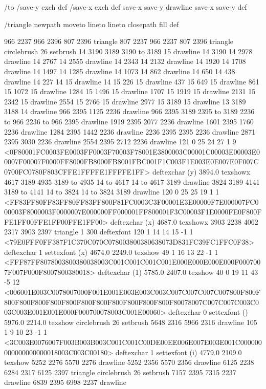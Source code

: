 /to
 { /save-y exch def
   /save-x exch def
   save-x save-y drawline
   save-x save-y } def

/triangle
 { newpath moveto lineto lineto closepath fill } def

966 2237 966 2396 807 2396 triangle
807 2237 966 2237 807 2396 triangle
circlebrush 26 setbrush
14 3190 3189 3190 to 3189 15 drawline
14 3190 14 2978 drawline
14 2767 14 2555 drawline
14 2343 14 2132 drawline
14 1920 14 1708 drawline
14 1497 14 1285 drawline
14 1073 14 862 drawline
14 650 14 438 drawline
14 227 14 15 drawline
14 15 226 15 drawline
437 15 649 15 drawline
861 15 1072 15 drawline
1284 15 1496 15 drawline
1707 15 1919 15 drawline
2131 15 2342 15 drawline
2554 15 2766 15 drawline
2977 15 3189 15 drawline
13 3189 3188 14 drawline
966 2395 1125 2236 drawline
966 2395 3189 2395 to 3189 2236 to 966 2236 to 966 2395 drawline
1919 2395 2077 2236 drawline
1601 2395 1760 2236 drawline
1284 2395 1442 2236 drawline
2236 2395 2395 2236 drawline
2871 2395 3030 2236 drawline
2554 2395 2712 2236 drawline
121 0 25 24 27 1 9 {{<0F80001FC0003FE0003FF0003F70003F78001E3800003C00001C00003E00003E00007F00007F0000FF8000FB8000FB8001FBC001F1C003F1E003E0E007E0F007C0700FC0780F803CFFE1FFFFE1FFFFE1FF>}} deftexchar
(y) 3894.0 texshowx
4617 3189 4935 3189 to 4935 14 to 4617 14 to 4617 3189 drawline
3824 3189 4141 3189 to 4141 14 to 3824 14 to 3824 3189 drawline
120 0 25 25 19 1 1 {{<FF83FF80FF83FF80FF83FF800F81FC0003C3F00001E3E00000F7E000007FC000003F8000003F0000007E000000FF000001FF800001F3C00003F1E0000FE0F800FFE1FF00FFE1FF00FFE1FF00>}} deftexchar
(x) 4687.0 texshowx
3903 2238 4062 2317 3903 2397 triangle
1 300 deftexfont
120 1 14 14 15 -1 1 {{<79E0FFF0FF387F1C370C070C078003800380638073D831FC39FC1FFC0F38>}} deftexchar
1 settexfont
(x) 4674.0 2249.0 texshow
49 1 16 13 22 -1 1 {{<FFF87FF8078003800380038003C001C001C001C001E000E000E000E000F0007007F007F000F8007800380018>}} deftexchar
(1) 5785.0 2407.0 texshow
40 0 19 11 43 -5 12 {{<006001E003C0078007000F001E001E003E003C003C007C007C007C007800F800F800F800F800F800F800F800F800F800F800F800F800F80078007C007C007C003C003C003E001E001E000F000700078003C001E00060>}} deftexchar
0 settexfont
() 5976.0 2214.0 texshow
circlebrush 26 setbrush
5648 2316 5966 2316 drawline
105 1 9 10 23 -1 1 {{<3C003E0076007F003B003B003C001C001C00DE00EE006E007E003E001C000000000000000000018003C003C00180>}} deftexchar
1 settexfont
(i) 4779.0 2109.0 texshow
5252 2276 5570 2276 drawline
5252 2356 5570 2356 drawline
6125 2238 6284 2317 6125 2397 triangle
circlebrush 26 setbrush
7157 2395 7315 2237 drawline
6839 2395 6998 2237 drawline
